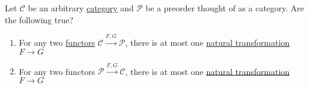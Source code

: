 Let $\mathcal{C}$ be an arbitrary \hyperref[D3.6]{category} and $\mathcal{P}$ be a preorder thought of as a category. Are the following true?
    \begin{enumerate}
      \item For any two \hyperref[D3.35]{functors} $\mathcal{C}\xrightarrow{F,G}\mathcal{P}$, there is at most one \hyperref[D3.49]{natural transformation} $F \rightarrow G$
      \item  For any two functors $\mathcal{P}\xrightarrow{F,G}\mathcal{C}$, there is at most one \hyperref[D3.49]{natural transformation} $F \rightarrow G$
    \end{enumerate}